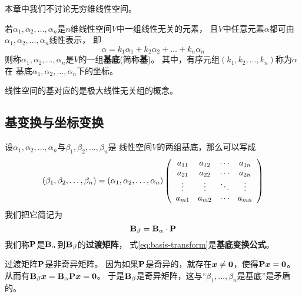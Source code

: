 \begin{remark}
  本章中我们不讨论无穷维线性空间。
\end{remark}

\begin{definition}[基与坐标]
  若$\alpha_1,\alpha_2,\dots,\alpha_n$是$n$维线性空间$V$中一组线性无关的元素，
  且$V$中任意元素$\alpha$都可由$\alpha_1,\alpha_2,\dots,\alpha_n$线性表示，
  即\[ \alpha = k_1\alpha_1 + k_2\alpha_2 + \dots + k_n\alpha_n \]
  则称$\alpha_1,\alpha_2,\dots,\alpha_n$是$V$的一组\textbf{基底}(简称\textbf{基})。
  其中，有序元组$(k_1,k_2,\dots,k_n)$称为$\alpha$在
  基底$\alpha_1,\alpha_2,\dots,\alpha_n$下的坐标。
\end{definition}

\begin{remark}
  线性空间的基对应的是极大线性无关组的概念。
\end{remark}

\subsection{基变换与坐标变换}
\begin{theorem}[基底变换公式]
  设$\alpha_1,\alpha_2,\dots,\alpha_n$与$\beta_1,\beta_2,\dots,\beta_n$是
  线性空间$V$的两组基底，那么可以写成
  \begin{equation} \label{eq:basis-transform}
    (\beta_1,\beta_2,\dots,\beta_n) = (\alpha_1,\alpha_2,\dots,\alpha_n)
    \mmat{cccc}{
      a_{11} & a_{12} & \cdots & a_{1n} \\
      a_{21} & a_{22} & \cdots & a_{2n} \\
      \vdots & \vdots & \ddots & \vdots \\
      a_{m1} & a_{m2} & \cdots & a_{mn} }
  \end{equation}
  我们把它简记为
  \begin{displaymath}
    \mmBasis{\beta} = \mmBasis{\alpha}\cdot\mmP
  \end{displaymath}
  我们称$\mmP$是$\mmBasis{\alpha}$到$\mmBasis{\beta}$的\textbf{过渡矩阵}，
  式\eqref{eq:basis-transform}是\textbf{基底变换公式}。
\end{theorem}

\begin{remark}
  过渡矩阵$\mmP$是非奇异矩阵。
  因为如果$\mmP$是奇异的，就存在$\mvx\neq\mvZero$，使得$\mmP\mvx=\mvZero$。
  从而有$\mmBasis{\beta}\mvx = \mmBasis{\alpha}\mmP\mvx = \mvZero$。
  于是$\mmBasis{\beta}$是奇异矩阵，这与``$\beta_1,\dots,\beta_n$是基底''是矛盾的。
\end{remark}

